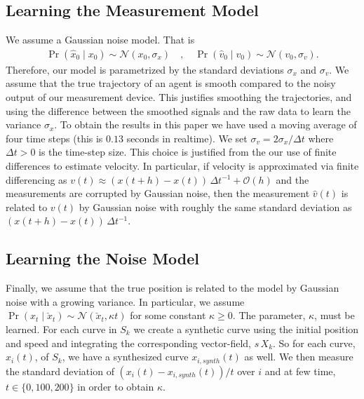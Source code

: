 \documentclass[letterpaper,10pt,conference]{ieeeconf}
\begin{document}
  \subsection{Learning the Measurement Model}
  We assume a Gaussian noise model.  
  That is
  \begin{align*}
  	\Pr( \hat{x}_0 \mid x_0 ) \sim \mathcal{N}( x_0 , \sigma_x) \quad, \quad \Pr( \hat{v}_0 \mid v_0 ) \sim \mathcal{N}( v_0, \sigma_v).
  \end{align*}
  Therefore, our model is parametrized by the standard deviations $\sigma_x$ and $\sigma_v$.
  We assume that the true trajectory of an agent is smooth compared to the noisy output of our measurement device.
  This justifies smoothing the trajectories, and using the difference between the smoothed signals and the raw data to learn the variance $\sigma_x$.
  To obtain the results in this paper we have used a moving average of four time steps (this is $0.13$ seconds in realtime).
  We set $\sigma_v = 2 \sigma_x / \Delta t$ where $\Delta t > 0$ is the time-step size.  
  This choice is justified from the our use of finite differences to estimate velocity.
  In particular, if velocity is approximated via finite differencing as $v(t) \approx (x(t+h) - x(t))\,\Delta t^{-1} + \mathcal{O}(h)$ and the measurements are corrupted by Gaussian noise, then the measurement $\hat{v}(t)$ is related to $v(t)$ by Gaussian noise with roughly the same standard deviation as $(x(t+h) - x(t))\,\Delta t^{-1}$.
  
  \subsection{Learning the Noise Model}
  Finally, we assume that the true position is related to the model by Gaussian noise with a growing variance.
  In particular, we assume $\Pr( x_t \mid \check{x}_t) \sim \mathcal{N}( \check{x}_t , \kappa t)$ for some constant $\kappa \geq 0$.
  The parameter, $\kappa$, must be learned.
  For each curve in $S_k$ we create a synthetic curve using the initial position and speed and integrating the corresponding vector-field, $s\, X_k$.
  So for each curve, $x_i(t)$, of $S_k$, we have a synthesized curve $x_{i,synth}(t)$ as well.
  We then measure the standard deviation of $(x_i(t) - x_{i,synth}(t)) / t$ over $i$ and at few time, $t \in \{ 0, 100, 200 \}$ in order to obtain $\kappa$.
  
\end{document}
